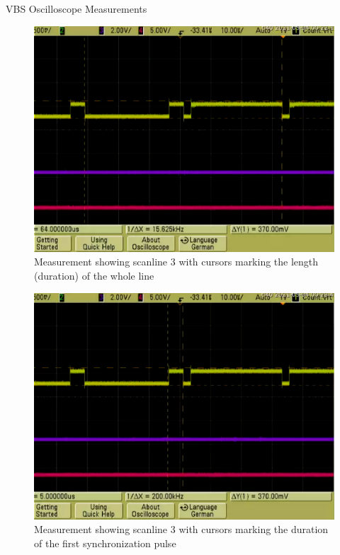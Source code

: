 \documentclass[10pt,a4paper,titlepage,oneside]{article}
\begin{document}
\maketitle



\begin{qa}{VBS Oscilloscope Measurements}

	\begin{figure}[h!]
		\centering
		\includegraphics[width=1.0\linewidth]{dia/oszi_1_scanline3_timing.png}
		\caption{Measurement showing scanline 3 with cursors marking the length (duration) of the whole line}
	\end{figure}
	
	\begin{figure}[h!]
		\centering
		\includegraphics[width=1.0\linewidth]{dia/oszi_2_first_puls_1.png}
		\caption{Measurement showing scanline 3 with cursors marking the duration of the first synchronization pulse}
	\end{figure}
	

\end{qa}
\end{document}
